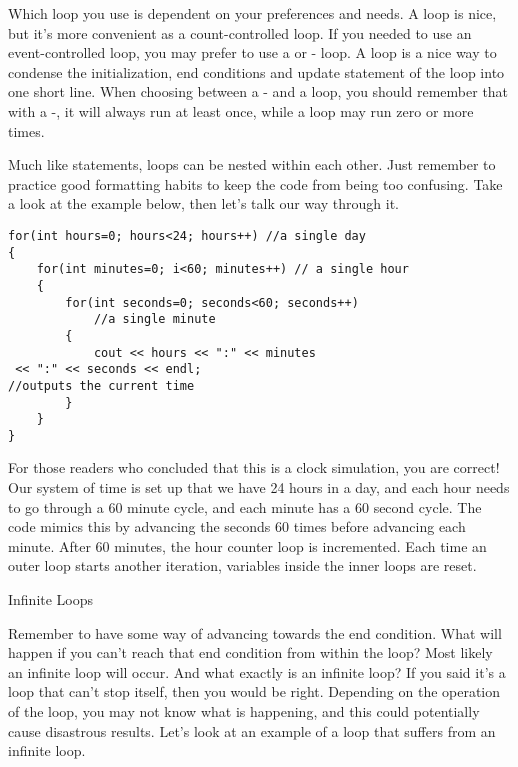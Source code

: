 
Which loop you use is dependent on your preferences and needs.
A  loop is nice, but it's more convenient as a count-controlled loop.
If you needed to use an event-controlled loop, you may prefer to use a  or - loop.
A  loop is a nice way to condense the initialization, end conditions and update statement of the loop into one short line.
When choosing between a - and a  loop, you should remember that with a -, it will always run at least once, while a  loop may run zero or more times.


Much like  statements, loops can be nested within each other.
Just remember to practice good formatting habits to keep the code from being too confusing.
Take a look at the example below, then let's talk our way through it.


\begin{lstlisting}
for(int hours=0; hours<24; hours++)	//a single day
{
	for(int minutes=0; i<60; minutes++)	// a single hour
	{
		for(int seconds=0; seconds<60; seconds++)
			//a single minute
		{
			cout << hours << ":" << minutes
 << ":" << seconds << endl;
//outputs the current time
		}
	}
}
\end{lstlisting}

For those readers who concluded that this is a clock simulation, you are correct!
Our system of time is set up that we have 24 hours in a day, and each hour needs to go through a 60 minute cycle, and each minute has a 60 second cycle.
The code mimics this by advancing the seconds 60 times before advancing each minute.
After 60 minutes, the hour counter loop is incremented. Each time an outer loop starts another iteration, variables inside the inner loops are reset.

Infinite Loops

Remember to have some way of advancing towards the end condition.
What will happen if you can't reach that end condition from within the loop?
Most likely an infinite loop will occur. And what exactly is an infinite loop?
If you said it's a loop that can't stop itself, then you would be right.
Depending on the operation of the loop, you may not know what is happening, and this could potentially cause disastrous results.
Let's look at an example of a  loop that suffers from an infinite loop.

